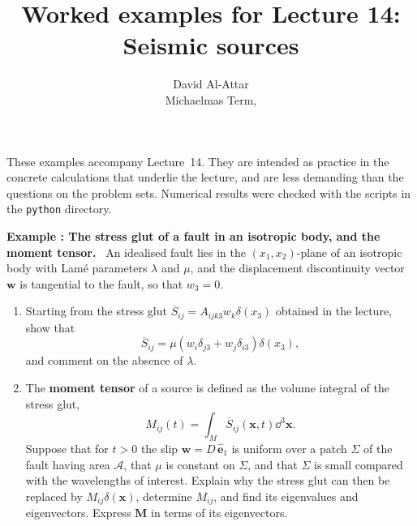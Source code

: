 \documentclass[a4paper,12pt]{paper}
\title{Worked examples for Lecture 14: Seismic sources}
\author{David Al-Attar \\ Michaelmas Term, \the\year}
\newcounter{example}
\renewenvironment{example}[1]{%
  \refstepcounter{example}%
  \begin{mdframed}[linewidth=1pt,innertopmargin=6pt,innerbottommargin=6pt]%
  \noindent\textbf{Example \theexample: #1.}\ }{%
  \end{mdframed}}
\begin{document}
\maketitle

\noindent These examples accompany Lecture~14. They are intended as practice in the concrete
calculations that underlie the lecture, and are less demanding than the questions on the
problem sets. Numerical results were checked with the scripts in the \texttt{python}
directory.

\begin{example}{The stress glut of a fault in an isotropic body, and the moment tensor}
An idealised fault lies in the $(x_{1},x_{2})$-plane of an isotropic body with Lam\'{e}
parameters $\lambda$ and $\mu$, and the displacement discontinuity vector $\mathbf{w}$ is
tangential to the fault, so that $w_{3}=0$.
\begin{enumerate}
    \item[(a)] Starting from the stress glut $\overline{S}_{ij}=A_{ijk3}w_{k}\delta(x_{3})$
    obtained in the lecture, show that
    \begin{equation*}
    \overline{S}_{ij}=\mu\left(w_{i}\delta_{j3}+w_{j}\delta_{i3}\right)\delta(x_{3}),
    \end{equation*}
    and comment on the absence of $\lambda$.
    \item[(b)] The \textbf{moment tensor} of a source is defined as the volume integral of
    the stress glut,
    \begin{equation*}
    M_{ij}(t)=\int_{M}\overline{S}_{ij}(\mathbf{x},t)\dd^{3}\mathbf{x}.
    \end{equation*}
    Suppose that for $t>0$ the slip $\mathbf{w}=D\,\hat{\mathbf{e}}_{1}$ is uniform over a
    patch $\Sigma$ of the fault having area $\mathcal{A}$, that $\mu$ is constant on $\Sigma$,
    and that $\Sigma$ is small compared with the wavelengths of interest. Explain why the
    stress glut can then be replaced by $M_{ij}\delta(\mathbf{x})$, determine $M_{ij}$, and
    find its eigenvalues and eigenvectors. Express $\mathbf{M}$ in terms of its eigenvectors.
\end{enumerate}
\end{example}
\end{document}
